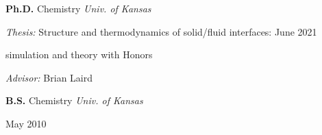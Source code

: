 {\bf Ph.D.} Chemistry \hfill \textit{Univ. of Kansas}

\textit{Thesis:} Structure and thermodynamics of solid/fluid interfaces: \hfill June 2021

simulation and theory \hfill with Honors

\textit{Advisor:} Brian Laird

\vspace{\y}
{\bf B.S.} Chemistry \hfill \textit{Univ. of Kansas}

\hfill May 2010
